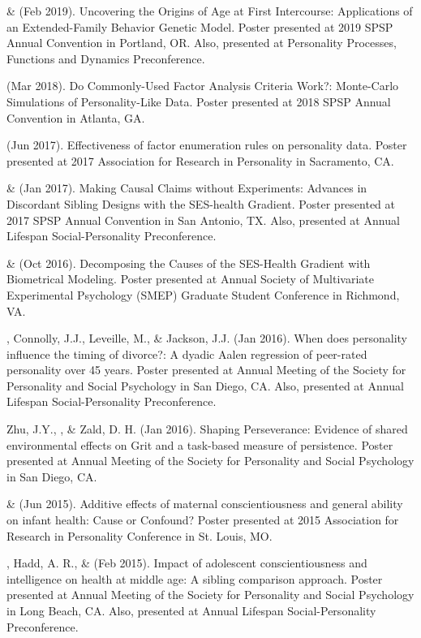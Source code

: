 \begin{etaremune}
\item \meb \& \Joe (Feb 2019). Uncovering the Origins of Age at First Intercourse: Applications of an Extended-Family Behavior Genetic Model. Poster presented at 2019 SPSP Annual Convention in Portland, OR. Also, presented at Personality Processes, Functions and Dynamics Preconference.
%

\item\meb (Mar 2018). Do Commonly-Used Factor Analysis Criteria Work?: Monte-Carlo Simulations of Personality-Like Data. Poster presented at 2018 SPSP Annual Convention in Atlanta, GA. 
%
\item\meb (Jun 2017). Effectiveness of factor enumeration rules on personality data. Poster presented at 2017 Association for Research in Personality in Sacramento, CA.
%
\item\meb \& \joe (Jan 2017). Making Causal Claims without Experiments: Advances in Discordant Sibling Designs with the SES-health Gradient. Poster presented at 2017 SPSP Annual Convention in San Antonio, TX. Also, presented at Annual Lifespan Social-Personality Preconference.
%
\item\meb \& \joe (Oct 2016). Decomposing the Causes of the SES-Health Gradient with Biometrical Modeling. Poster presented at Annual Society of Multivariate Experimental Psychology (SMEP) Graduate Student Conference in Richmond, VA.
%
\item \meb, Connolly, J.J., Leveille, M., \& Jackson, J.J. (Jan 2016). When does personality influence the timing of divorce?: A dyadic Aalen regression of peer-rated personality over 45 years. Poster presented at Annual Meeting of the Society for Personality and Social Psychology in San Diego, CA. Also, presented at Annual Lifespan Social-Personality Preconference.
%
\item Zhu, J.Y., \meb, \joe \& Zald, D. H. (Jan 2016). Shaping Perseverance: Evidence of shared environmental effects on Grit and a task-based measure of persistence. Poster presented at Annual Meeting of the Society for Personality and Social Psychology in San Diego, CA.
%

\item \meb \& \joe (Jun 2015). Additive effects of maternal conscientiousness and general ability on infant health: Cause or Confound? Poster presented at 2015 Association for Research in Personality Conference in St. Louis, MO. %
%
\item \meb, Hadd, A. R., \& \joe (Feb 2015). Impact of adolescent conscientiousness and intelligence on health at middle age: A sibling comparison approach. Poster presented at Annual Meeting of the Society for Personality and Social Psychology in Long Beach, CA. Also, presented at Annual Lifespan Social-Personality Preconference.
%


\end{etaremune}
